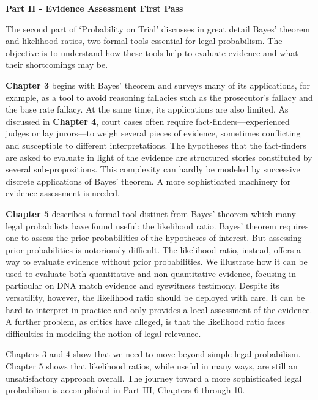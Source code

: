 \documentclass[
  10pt,
  dvipsnames,enabledeprecatedfontcommands]{scrartcl}
\begin{document}
\vspace{3mm}

\noindent \textbf{Part II - Evidence Assessment First Pass}

\noindent The second part of `Probability on Trial' discusses in great
detail Bayes' theorem and likelihood ratios, two formal tools essential
for legal probabilism. The objective is to understand how these tools
help to evaluate evidence and what their shortcomings may be.

\textbf{Chapter 3} begins with Bayes' theorem and surveys many of its
applications, for example, as a tool to avoid reasoning fallacies such
as the prosecutor's fallacy and the base rate fallacy. At the same time,
its applications are also limited. As discussed in \textbf{Chapter 4},
court cases often require fact-finders---experienced judges or lay
jurors---to weigh several pieces of evidence, sometimes conflicting and
susceptible to different interpretations. The hypotheses that the
fact-finders are asked to evaluate in light of the evidence are
structured stories constituted by several sub-propositions. This
complexity can hardly be modeled by successive discrete applications of
Bayes' theorem. A more sophisticated machinery for evidence assessment
is needed.

\textbf{Chapter 5} describes a formal tool distinct from Bayes' theorem
which many legal probabilists have found useful: the likelihood ratio.
Bayes' theorem requires one to assess the prior probabilities of the
hypotheses of interest. But assessing prior probabilities is notoriously
difficult. The likelihood ratio, instead, offers a way to evaluate
evidence without prior probabilities. We illustrate how it can be used
to evaluate both quantitative and non-quantitative evidence, focusing in
particular on DNA match evidence and eyewitness testimony. Despite its
versatility, however, the likelihood ratio should be deployed with care.
It can be hard to interpret in practice and only provides a local
assessment of the evidence. A further problem, as critics have alleged,
is that the likelihood ratio faces difficulties in modeling the notion
of legal relevance.

Chapters 3 and 4 show that we need to move beyond simple legal
probabilism. Chapter 5 shows that likelihood ratios, while useful in
many ways, are still an unsatisfactory approach overall. The journey
toward a more sophisticated legal probabilism is accomplished in Part
III, Chapters 6 through 10.

\vspace{3mm}
\end{document}
